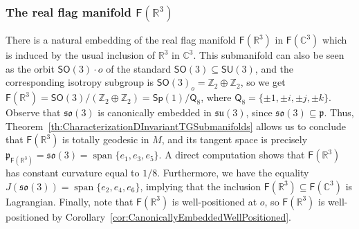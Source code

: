 \documentclass[11pt,a4paper,final]{amsart}
\newcommand{\s}{\mathsf}
\newcommand{\g}{\mathfrak}
\newcommand{\R}{\mathbb{R}}
\newcommand{\C}{\mathbb{C}}
\newcommand{\vecspan}{\operatorname{span}}
\theoremstyle{definition}
\begin{document}
\subsubsection{The real flag manifold $\mathsf{F}(\R^{3})$ \cite[Example~3.1]{Storm}}\label{ex:realflag}
There is a natural embedding of the real flag manifold $\mathsf{F}(\R^{3})$ in $\mathsf{F}(\C^{3})$ which is induced by the usual inclusion of $\R^3$ in $\C^3$.
This submanifold can also be seen as the orbit $\mathsf{SO}(3)\cdot o$ of the standard $\mathsf{SO}(3)\subseteq \mathsf{SU}(3)$, and the corresponding isotropy subgroup is $\mathsf{SO}(3)_{o}=\mathbb{Z}_{2}\oplus \mathbb{Z}_{2}$, so we get $\mathsf{F}(\R^{3})=\mathsf{SO}(3)/(\mathbb{Z}_{2}\oplus\mathbb{Z}_{2})=\mathsf{Sp}(1)/\mathsf{Q}_{8}$, where $\mathsf{Q}_{8}=\{\pm 1, \pm i, \pm j, \pm k\}$.
Observe that $\g{so}(3)$ is canonically embedded in $\g{su}(3)$, since $\g{so}(3)\subseteq \g{p}$. Thus, Theorem~\ref{th:CharacterizationDInvariantTGSubmanifolds} allows us to conclude that $\mathsf{F}(\R^{3})$ is totally geodesic in $M$, and its tangent space is precisely $\g{p}_{\mathsf{F}(\R^{3})}=\g{so}(3)=\vecspan\{e_{1},e_{3},e_{5}\}$.
A direct computation shows that $\mathsf{F}(\R^{3})$ has constant curvature equal to $1/8$.
Furthermore, we have the equality $J (\g{so}(3))=\vecspan\{e_{2},e_{4},e_{6}\}$, implying that the inclusion $\mathsf{F}(\R^{3})\subseteq \mathsf{F}(\C^{3})$ is Lagrangian.
Finally, note that $\s{F}(\R^{3})$ is well-positioned at $o$, so $\s{F}(\R^{3})$ is well-positioned by Corollary~\ref{cor:CanonicallyEmbeddedWellPositioned}.
	
\end{document}
